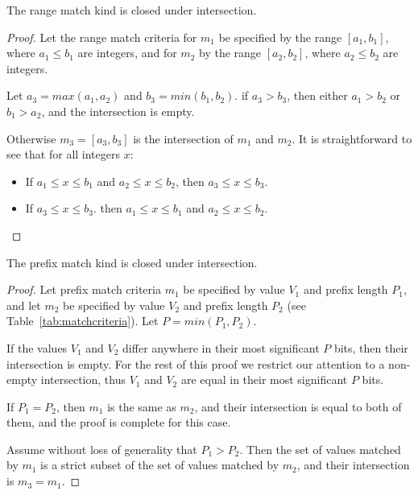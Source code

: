 \documentclass[acmsmall]{acmart}
\begin{document}
\begin{lemma}
\label{lem:rangematchclosedunderintersection}
The range match kind is closed under intersection.
\end{lemma}

\begin{proof}
Let the range match criteria for $m_1$
be specified by the range $[a_1, b_1]$, where $a_1 \leq b_1$ are integers,
and for $m_2$ by the range $[a_2, b_2]$, where $a_2 \leq b_2$ are integers.

Let $a_3 = max(a_1, a_2)$ and $b_3 = min(b_1, b_2)$.
if $a_3 > b_3$, then either $a_1 > b_2$ or $b_1 > a_2$,
and the intersection is empty.

Otherwise $m_3 = [a_3, b_3]$ is the intersection of $m_1$ and $m_2$.
It is straightforward to see that for all integers $x$:
\begin{itemize}
\item If $a_1 \leq x \leq b_1$ and $a_2 \leq x \leq b_2$,
  then $a_3 \leq x \leq b_3$.
\item If $a_3 \leq x \leq b_3$.
  then $a_1 \leq x \leq b_1$ and $a_2 \leq x \leq b_2$.
\end{itemize}
\end{proof}

\begin{lemma}
\label{lem:prefixmatchclosedunderintersection}
The prefix match kind is closed under intersection.
\end{lemma}

\begin{proof}
Let prefix match criteria $m_1$
be specified by value $V_1$ and prefix length $P_1$,
and let $m_2$
be specified by value $V_2$ and prefix length $P_2$
(see Table~\ref{tab:matchcriteria}).
Let $P=min(P_1,P_2)$.

If the values $V_1$ and $V_2$ differ anywhere in their
most significant $P$ bits, then their intersection is empty.
For the rest of this proof we restrict our attention to
a non-empty intersection, thus $V_1$ and $V_2$ are equal
in their most significant $P$ bits.

If $P_1 = P_2$, then $m_1$ is the same as $m_2$,
and their intersection is equal to both of them,
and the proof is complete for this case.

Assume without loss of generality that $P_1 > P_2$.
Then the set of values matched by $m_1$ is a strict
subset of the set of values matched by $m_2$,
and their intersection is $m_3 = m_1$.
\end{proof}
\end{document}
